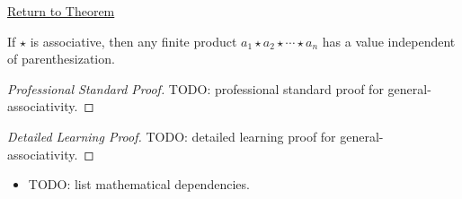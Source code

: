 \newpage
{}
\label{prf:general-associativity}

\begin{remark*}[Return]
\hyperref[thm:general-associativity]{Return to Theorem}
\end{remark*}

\begin{theorem*}
If $\star$ is associative, then any finite product
$a_1\star a_2\star\cdots\star a_n$ has a value independent of
parenthesization.
\end{theorem*}

\begin{proof}[Professional Standard Proof]
\LRAProofBodyStart
TODO: professional standard proof for general-associativity.
\end{proof}

\begin{proof}[Detailed Learning Proof]
\LRAProofBodyStart
TODO: detailed learning proof for general-associativity.
\end{proof}

\begin{remark*}
\end{remark*}

\begin{dependencies}
\begin{itemize}
  \item TODO: list mathematical dependencies.
\end{itemize}
\end{dependencies}

\clearpage

